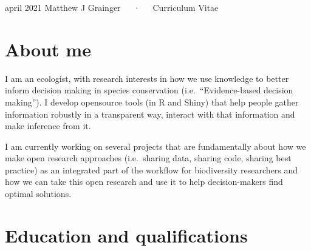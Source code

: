 \documentclass[11pt, a4paper]{awesome-cv}
\begin{document}
\makecvheader

\makecvfooter
  {april 2021}
    {Matthew J Grainger~~~·~~~Curriculum Vitae}
  {\thepage}





\hypertarget{about-me}{%
\section{About me}\label{about-me}}

I am an ecologist, with research interests in how we use knowledge to
better inform decision making in species conservation
(i.e.~``Evidence-based decision making''). I develop opensource tools
(in R and Shiny) that help people gather information robustly in a
transparent way, interact with that information and make inference from
it.

I am currently working on several projects that are fundamentally about
how we make open research approaches (i.e.~sharing data, sharing code,
sharing best practice) as an integrated part of the workflow for
biodiversity researchers and how we can take this open research and use
it to help decision-makers find optimal solutions.

\hypertarget{education-and-qualifications}{%
\section{Education and
qualifications}\label{education-and-qualifications}}

\begin{cventries}
    \vspace{-4.0mm}
    \vspace{-4.0mm}
    \vspace{-4.0mm}
\end{cventries}
\end{document}
